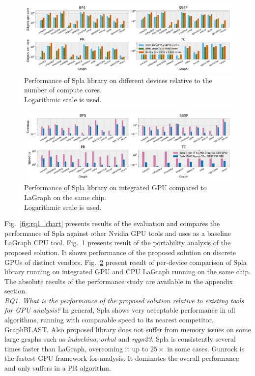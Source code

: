\begin{figure}[tbp]
\centering
\includegraphics[width=1.0\linewidth]{plots/rq2_cores.pdf}
\caption{Performance of Spla library on different devices relative to the number of compute cores.\\Logarithmic scale is used.}
\label{fig:rq2_chart}
\end{figure}

\begin{figure}[tbp]
\centering
\includegraphics[width=1.0\linewidth]{plots/rq3_int.pdf}
\caption{Performance of Spla library on integrated GPU compared to LaGraph on the same chip.\\Logarithmic scale is used.}
\label{fig:rq3_chart}
\end{figure}

Fig.~\ref{fig:rq1_chart} presents results of the evaluation and compares the performance of Spla against other Nvidia GPU tools and uses as a baseline LaGraph CPU tool. 
Fig.~\ref{fig:rq2_chart} presents result of the portability analysis of the proposed solution. It shows performance of the proposed solution on discrete GPUs of distinct vendors.
Fig.~\ref{fig:rq3_chart} present result of per-device comparison of Spla library running on integrated GPU and CPU LaGraph running on the same chip. The absolute results of the performance study are available in the appendix section.\\

\textit{RQ1. What is the performance of the proposed solution relative to existing tools for GPU analysis?} In general, Spla shows very acceptable performance in all algorithms, running with comparable speed to its nearest competitor, GraphBLAST. Also proposed library does not suffer from memory issues on some large graphs such as \textit{indochina}, \textit{orkut} and \textit{rggn23}. Spla is consistently several times faster than LaGraph, overcoming it up to $25\times$ in some cases. Gunrock is the fastest GPU framework for analysis. It dominates the overall performance and only suffers in a PR algorithm.

